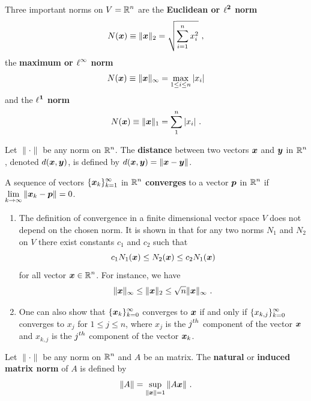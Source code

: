 \begin{rmk}
Three important norms on $\displaystyle V=\mathbb{R}^n$ are the
{\bfseries Euclidean or $\displaystyle \mathbf{\ell^2}$
norm}
\[
N(\bm{x}) \equiv \|\bm{x} \|_2 = \sqrt{\sum_{i=1}^{n} x_i^2} \ ,
\]
the {\bfseries maximum or $\displaystyle \mathbf{\ell^\infty}$
norm} 
\[
N(\bm{x}) \equiv \| \bm{x} \|_{\infty} = \max_{1\leq i \leq n} |x_i|
\]
and the {\bfseries $\displaystyle \mathbf{\ell^1}$
norm}
\[
N(\bm{x}) \equiv \| \bm{x} \|_1 = \sum_1^n |x_i| \ .
\]
\end{rmk}

\begin{defn}
Let $\|\cdot\|$ be any norm on $\displaystyle \mathbb{R}^n$.  The
{\bfseries distance}
between two vectors $\bm{x}$ and $\bm{y}$ in $\displaystyle \mathbb{R}^n$,
denoted $d(\bm{x},\bm{y})$, is defined by 
$d(\bm{x},\bm{y}) = \| \bm{x} - \bm{y} \|$.
\end{defn}

\begin{defn}
A sequence of vectors
$\displaystyle \{\bm{x}_k\}_{k=1}^\infty$ in
$\displaystyle \mathbb{R}^n$ {\bfseries converges} to a
vector $\bm{p}$ in $\displaystyle \mathbb{R}^n$ if
$\displaystyle \lim_{k\to \infty} \| \bm{x}_k - \bm{p} \| = 0$.
\end{defn}

\begin{rmkList} \label{equiv_norms}
\begin{enumerate}
\item The definition of convergence in a finite dimensional vector
space $V$ does not depend on the chosen norm.  It is shown in
\cite{HS} that for any two norms $N_1$ and $N_2$ on $V$ there exist
constants $c_1$ and $c_2$ such that
\[
c_1 N_1(\bm{x}) \leq N_2(\bm{x}) \leq c_2 N_1(\bm{x})
\]
for all vector $\displaystyle \bm{x} \in \mathbb{R}^n$.
For instance, we have
\[
\|\bm{x}\|_\infty \leq \|\bm{x}\|_2 \leq \sqrt{n}\|\bm{x}\|_\infty \ .
\]
\item One can also show that
$\displaystyle \{\bm{x}_k\}_{k=0}^\infty$
converges to $\bm{x}$ if and only if
$\displaystyle \{x_{k,j}\}_{k=0}^\infty$
converges to $x_j$ for $1\leq j \leq n$, where $x_j$ is the
$\displaystyle j^{th}$ component of the vector $\bm{x}$ and $x_{k,j}$ is the
$\displaystyle j^{th}$ component of the vector $\bm{x}_k$.
\end{enumerate}
\end{rmkList}

\begin{defn}
Let $\|\cdot\|$ be any norm on $\displaystyle \mathbb{R}^n$ and
$A$ be an \nn matrix.  The
{\bfseries natural} or
{\bfseries induced matrix norm}
of $A$ is defined by 
\[
\| A \| = \sup_{\|\bm{x} \| =1 } \| A \bm{x} \| \ .
\]
\end{defn}

